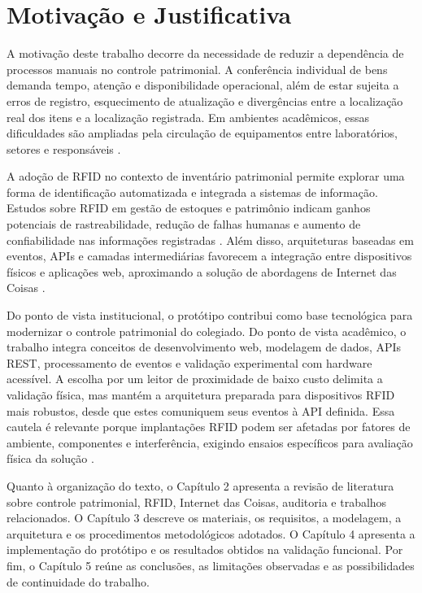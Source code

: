 \section{Motivação e Justificativa}
\label{sec:justificativa}

A motivação deste trabalho decorre da necessidade de reduzir a dependência de processos manuais no controle patrimonial. A conferência individual de bens demanda tempo, atenção e disponibilidade operacional, além de estar sujeita a erros de registro, esquecimento de atualização e divergências entre a localização real dos itens e a localização registrada. Em ambientes acadêmicos, essas dificuldades são ampliadas pela circulação de equipamentos entre laboratórios, setores e responsáveis \cite{tceba2018,brito2019}.

A adoção de RFID no contexto de inventário patrimonial permite explorar uma forma de identificação automatizada e integrada a sistemas de informação. Estudos sobre RFID em gestão de estoques e patrimônio indicam ganhos potenciais de rastreabilidade, redução de falhas humanas e aumento de confiabilidade nas informações registradas \cite{brito2019,mashayekhy2022}. Além disso, arquiteturas baseadas em eventos, APIs e camadas intermediárias favorecem a integração entre dispositivos físicos e aplicações web, aproximando a solução de abordagens de Internet das Coisas \cite{abijaude2017,razzaque2015}.

Do ponto de vista institucional, o protótipo contribui como base tecnológica para modernizar o controle patrimonial do colegiado. Do ponto de vista acadêmico, o trabalho integra conceitos de desenvolvimento web, modelagem de dados, APIs REST, processamento de eventos e validação experimental com hardware acessível. A escolha por um leitor de proximidade de baixo custo delimita a validação física, mas mantém a arquitetura preparada para dispositivos RFID mais robustos, desde que estes comuniquem seus eventos à API definida. Essa cautela é relevante porque implantações RFID podem ser afetadas por fatores de ambiente, componentes e interferência, exigindo ensaios específicos para avaliação física da solução \cite{knapp2022}.

Quanto à organização do texto, o Capítulo 2 apresenta a revisão de literatura sobre controle patrimonial, RFID, Internet das Coisas, auditoria e trabalhos relacionados. O Capítulo 3 descreve os materiais, os requisitos, a modelagem, a arquitetura e os procedimentos metodológicos adotados. O Capítulo 4 apresenta a implementação do protótipo e os resultados obtidos na validação funcional. Por fim, o Capítulo 5 reúne as conclusões, as limitações observadas e as possibilidades de continuidade do trabalho.
